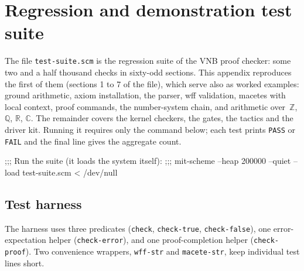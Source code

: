 \chapter{Regression and demonstration test suite}
\label{app:tests}

The file \texttt{test-suite.scm} is the regression suite of the VNB
proof checker: some two and a half thousand checks in sixty-odd
sections.  This appendix reproduces the first of them (sections 1 to 7
of the file), which serve also as worked examples: ground arithmetic,
axiom installation, the parser, wff validation, macetes with local
context, proof commands, the number-system chain, and arithmetic
over~$\mathbb{Z}$, $\mathbb{Q}$, $\mathbb{R}$, $\mathbb{C}$.  The
remainder covers the kernel checkers, the gates, the tactics and the
driver kit.  Running it requires only the command below; each test
prints \texttt{PASS} or \texttt{FAIL} and the final line gives the
aggregate count.

\begin{VNBcode}
;;; Run the suite (it loads the system itself):
;;;   mit-scheme --heap 200000 --quiet --load test-suite.scm < /dev/null
\end{VNBcode}

\section{Test harness}

\begin{sloppypar}The harness uses three predicates (\texttt{check}, \texttt{check-true},
\texttt{check-false}), one error-expectation helper
(\texttt{check-error}), and one proof-completion helper
(\texttt{check-proof}).  Two convenience wrappers, \texttt{wff-str} and
\texttt{macete-str}, keep individual test lines short.\end{sloppypar}

